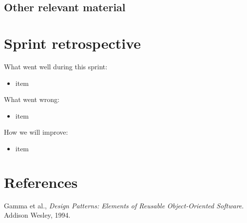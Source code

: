 \documentclass[a4paper,11pt]{article}
\begin{document}


\subsection{Other relevant material}

\section{Sprint retrospective}

What went well during this sprint:

\begin{itemize}
	\item item
\end{itemize}

\noindent
What went wrong:

\begin{itemize}
	\item item
\end{itemize}

\noindent
How we will improve:
\begin{itemize}
	\item item
\end{itemize}

\section{References}
\begin{thebibliography}{9}
\vspace{-3em}

  Gamma et al.,
  \emph{Design Patterns: Elements of Reusable Object-Oriented Software}.
  Addison Wesley, 1994.

\end{thebibliography}
\end{document}
